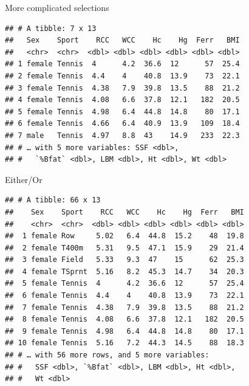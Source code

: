 \documentclass[ignorenonframetext,]{beamer}
\newenvironment{Shaded}{\begin{snugshade}}{\end{snugshade}}
\newcommand{\DecValTok}[1]{\textcolor[rgb]{0.00,0.00,0.81}{#1}}
\newcommand{\KeywordTok}[1]{\textcolor[rgb]{0.13,0.29,0.53}{\textbf{#1}}}
\newcommand{\NormalTok}[1]{#1}
\newcommand{\OperatorTok}[1]{\textcolor[rgb]{0.81,0.36,0.00}{\textbf{#1}}}
\newcommand{\StringTok}[1]{\textcolor[rgb]{0.31,0.60,0.02}{#1}}
\begin{document}
\begin{frame}[fragile]{More complicated selections}
\protect\hypertarget{more-complicated-selections}{}

\begin{Shaded}
\end{Shaded}

\begin{verbatim}
## # A tibble: 7 x 13
##   Sex    Sport    RCC   WCC    Hc    Hg  Ferr   BMI
##   <chr>  <chr>  <dbl> <dbl> <dbl> <dbl> <dbl> <dbl>
## 1 female Tennis  4      4.2  36.6  12      57  25.4
## 2 female Tennis  4.4    4    40.8  13.9    73  22.1
## 3 female Tennis  4.38   7.9  39.8  13.5    88  21.2
## 4 female Tennis  4.08   6.6  37.8  12.1   182  20.5
## 5 female Tennis  4.98   6.4  44.8  14.8    80  17.1
## 6 female Tennis  4.66   6.4  40.9  13.9   109  18.4
## 7 male   Tennis  4.97   8.8  43    14.9   233  22.3
## # … with 5 more variables: SSF <dbl>,
## #   `%Bfat` <dbl>, LBM <dbl>, Ht <dbl>, Wt <dbl>
\end{verbatim}

\end{frame}

\begin{frame}[fragile]{Either/Or}
\protect\hypertarget{eitheror}{}

\begin{Shaded}
\end{Shaded}

\begin{verbatim}
## # A tibble: 66 x 13
##    Sex    Sport    RCC   WCC    Hc    Hg  Ferr   BMI
##    <chr>  <chr>  <dbl> <dbl> <dbl> <dbl> <dbl> <dbl>
##  1 female Row     5.02   6.4  44.8  15.2    48  19.8
##  2 female T400m   5.31   9.5  47.1  15.9    29  21.4
##  3 female Field   5.33   9.3  47    15      62  25.3
##  4 female TSprnt  5.16   8.2  45.3  14.7    34  20.3
##  5 female Tennis  4      4.2  36.6  12      57  25.4
##  6 female Tennis  4.4    4    40.8  13.9    73  22.1
##  7 female Tennis  4.38   7.9  39.8  13.5    88  21.2
##  8 female Tennis  4.08   6.6  37.8  12.1   182  20.5
##  9 female Tennis  4.98   6.4  44.8  14.8    80  17.1
## 10 female Tennis  5.16   7.2  44.3  14.5    88  18.3
## # … with 56 more rows, and 5 more variables:
## #   SSF <dbl>, `%Bfat` <dbl>, LBM <dbl>, Ht <dbl>,
## #   Wt <dbl>
\end{verbatim}

\end{frame}
\end{document}
